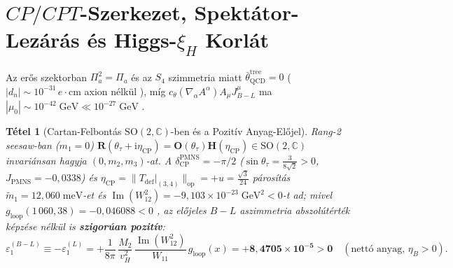 \documentclass[11pt,a4paper]{article}
\newtheorem{theorem}{Tétel}[section]
\begin{document}
\section{\texorpdfstring{$CP/CPT$}{CP/CPT}-Szerkezet, Spektátor-Lezárás és Higgs-\texorpdfstring{$\xi_H$}{xi\_H} Korlát}
\label{sec:cp}

Az erős szektorban $\Pi_a^2 = \Pi_a$ és az $S_4$ szimmetria miatt $\bar{\theta}_{\mathrm{QCD}}^{\mathrm{tree}} = 0$ ($|d_n| \sim 10^{-31}\,e\cdot\mathrm{cm}$ axion nélkül \cite{EllisGaillard1979,Abel2020nEDM}), míg $c_\theta(\nabla_\alpha A^\alpha)A_\mu J_{B-L}^\mu$ ma $|\mu_0| \sim 10^{-42}\;\mathrm{GeV} \ll 10^{-27}\;\mathrm{GeV}$ \cite{CohenKaplan1987}.

\begin{theorem}[Cartan-Felbontás \texorpdfstring{$\mathrm{SO}(2,\mathbb{C})$}{SO(2,C)}-ben és a Pozitív Anyag-Előjel]
\label{thm:ci}
Rang-2 seesaw-ban ($m_1 = 0$) $\mathbf{R}(\theta_\tau + \mathrm{i}\eta_{\mathrm{CP}}) = \mathbf{O}(\theta_\tau)\mathbf{H}(\eta_{\mathrm{CP}}) \in \mathrm{SO}(2,\mathbb{C})$ \cite{CasasIbarra2001,IbarraRoss2004} invariánsan hagyja $(0, m_2, m_3)$-at. A $\delta_{\mathrm{CP}}^{\mathrm{PMNS}} = -\pi/2$ ($\sin\theta_\tau = \frac{3}{8\sqrt{2}} > 0$, $J_{\mathrm{PMNS}} = -0{,}0338$) és $\eta_{\mathrm{CP}} = \|T_{\mathrm{def}}|_{(3,4)}\|_{\mathrm{op}} = +u = \frac{\sqrt{3}}{24}$ párosítás $\tilde{m}_1 = 12{,}060\;\mathrm{meV}$-et és $\operatorname{Im}(W_{12}^2) = -9{,}103\times 10^{-23}\;\mathrm{GeV}^2 < 0$-t ad; mivel $g_{\mathrm{loop}}(1\,060{,}38) = -0{,}046088 < 0$ \cite{CoviRouletVissani1996}, az előjeles $B-L$ aszimmetria abszolútérték képzése nélkül is \textbf{szigorúan pozitív}:
\begin{equation}
\varepsilon_1^{(B-L)} \equiv -\varepsilon_1^{(L)} = +\frac{1}{8\pi}\,\frac{M_2}{v_H^2}\,\frac{\operatorname{Im}(W_{12}^2)}{W_{11}}\,g_{\mathrm{loop}}(x) = \mathbf{+8{,}4705\times 10^{-5} > 0}\quad(\text{nettó anyag, }\eta_B > 0).
\end{equation}
\end{theorem}
\end{document}
